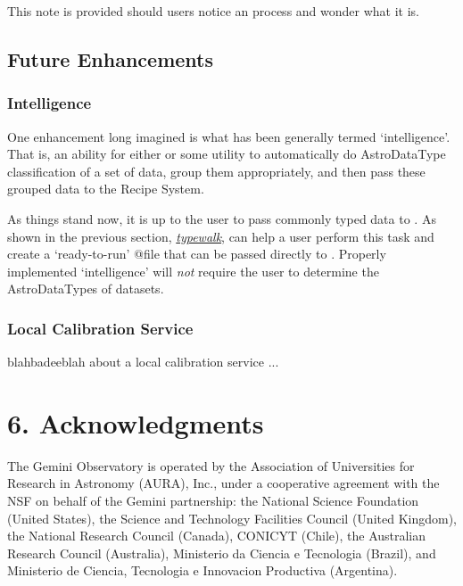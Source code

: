 \documentclass[letterpaper,10pt,english]{sphinxmanual}
\begin{document}
This note is provided should users notice an  process and wonder what
it is.


\section{Future Enhancements}
\label{discuss:future-enhancements}

\subsection{Intelligence}
\label{discuss:intelligence}
One enhancement long imagined is what has been generally termed `intelligence'.
That is, an ability for either  or some utility to automatically do
AstroDataType classification of a set of data, group them appropriately, and
then pass these grouped data to the Recipe System.

As things stand now, it is up to the user to pass commonly typed data to
. As shown in the previous section, {\hyperref[supptools:typewalk]{\emph{typewalk}}}, 
can help a user perform this task and create a `ready-to-run' @file that can
be passed directly to . Properly implemented `intelligence' will
\emph{not} require the user to determine the AstroDataTypes of datasets.


\subsection{Local Calibration Service}
\label{discuss:local-calibration-service}
blahbadeeblah about a local calibration service ...


\chapter{6. Acknowledgments}
\label{ack::doc}\label{ack:acknowledgments}
The Gemini Observatory is operated by the Association of Universities for
Research in Astronomy (AURA), Inc., under a cooperative agreement with the NSF on
behalf of the Gemini partnership: the National Science Foundation
(United States), the Science and Technology Facilities Council (United Kingdom),
the National Research Council (Canada), CONICYT (Chile), the Australian
Research Council (Australia), Ministerio da Ciencia e Tecnologia (Brazil),
and Ministerio de Ciencia, Tecnologia e Innovacion Productiva (Argentina).



\renewcommand{\indexname}{Index}
\printindex
\end{document}

